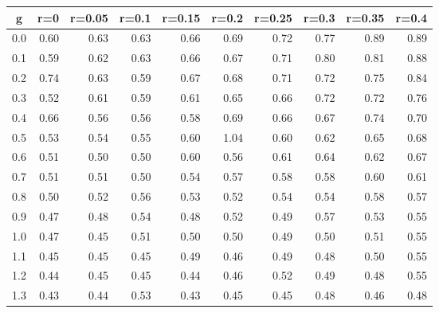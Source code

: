 %
\begin{table}[!tbp]
 \begin{center}
 \begin{tabular}{rrrrrrrrrr}\hline\hline
\multicolumn{1}{c}{g}&\multicolumn{1}{c}{r=0}&\multicolumn{1}{c}{r=0.05}&\multicolumn{1}{c}{r=0.1}&\multicolumn{1}{c}{r=0.15}&\multicolumn{1}{c}{r=0.2}&\multicolumn{1}{c}{r=0.25}&\multicolumn{1}{c}{r=0.3}&\multicolumn{1}{c}{r=0.35}&\multicolumn{1}{c}{r=0.4}\tabularnewline
\hline
0.0&0.60&0.63&0.63&0.66&0.69&0.72&0.77&0.89&0.89\tabularnewline
0.1&0.59&0.62&0.63&0.66&0.67&0.71&0.80&0.81&0.88\tabularnewline
0.2&0.74&0.63&0.59&0.67&0.68&0.71&0.72&0.75&0.84\tabularnewline
0.3&0.52&0.61&0.59&0.61&0.65&0.66&0.72&0.72&0.76\tabularnewline
0.4&0.66&0.56&0.56&0.58&0.69&0.66&0.67&0.74&0.70\tabularnewline
0.5&0.53&0.54&0.55&0.60&1.04&0.60&0.62&0.65&0.68\tabularnewline
0.6&0.51&0.50&0.50&0.60&0.56&0.61&0.64&0.62&0.67\tabularnewline
0.7&0.51&0.51&0.50&0.54&0.57&0.58&0.58&0.60&0.61\tabularnewline
0.8&0.50&0.52&0.56&0.53&0.52&0.54&0.54&0.58&0.57\tabularnewline
0.9&0.47&0.48&0.54&0.48&0.52&0.49&0.57&0.53&0.55\tabularnewline
1.0&0.47&0.45&0.51&0.50&0.50&0.49&0.50&0.51&0.55\tabularnewline
1.1&0.45&0.45&0.45&0.49&0.46&0.49&0.48&0.50&0.55\tabularnewline
1.2&0.44&0.45&0.45&0.44&0.46&0.52&0.49&0.48&0.55\tabularnewline
1.3&0.43&0.44&0.53&0.43&0.45&0.45&0.48&0.46&0.48\tabularnewline
\hline
\end{tabular}

\end{center}

\end{table}

